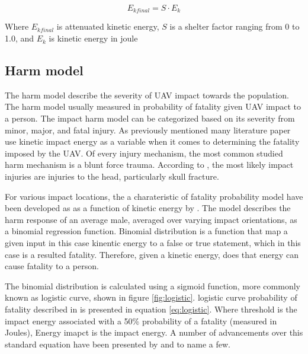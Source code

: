 \documentclass[12pt]{report}
\begin{document}
            \begin{equation}\label{eq:shelter_factor}
                E_{k final} = S \cdot E_k
            \end{equation}

            Where \(E_{k final}\) is attenuated kinetic energy,  \(S\) is a shelter factor ranging from 0 to 1.0, and
            \(E_k\) is kinetic energy in joule
            
        \subsection{Harm model}
            The harm model describe the severity of UAV impact towards the population. The harm model usually measured
            in probability of fatality given UAV impact to a person. The impact harm model can be categorized based on
            its severity from minor, major, and fatal injury. As previously mentioned many literature paper use kinetic
            impact energy as a variable when it comes to determining the fatality imposed by the UAV.  Of every injury
            mechanism, the most common studied harm mechanism is a blunt force trauma. According to
            \cite{shelley_model_2016}, the most likely impact injuries are injuries to the head, particularly skull
            fracture. 

            For various impact locations, the a charateristic of fatality probability model have been developed as as a
            function of kinetic energy by \cite{harwick_approved_2007}. The model describes the harm response of an
            average male, averaged over varying impact orientations, as a binomial regression function. Binomial
            distribution is a function that map a given input in this case kinentic energy to a false or true statement,
            which in this case is a resulted fatality. Therefore, given a kinetic energy, does that energy can cause
            fatality to a person. 
            
            The binomial distribution is calculated using a sigmoid function, more commonly known as logistic curve,
            shown in figure \ref{fig:logistic}. logistic curve probability of fatality described in
            \cite{shelley_model_2016} is presented in equation \ref{eq:logistic}. Where threshold is the impact energy
            associated with a 50\% probability of a fatality (measured in Joules), Energy imapct is the impact energy. A
            number of advancements over this standard equation have been presented by
            \cite{dalamagkidis_evaluating_2008} and \cite{shelley_model_2016} to name a few.
\end{document}
